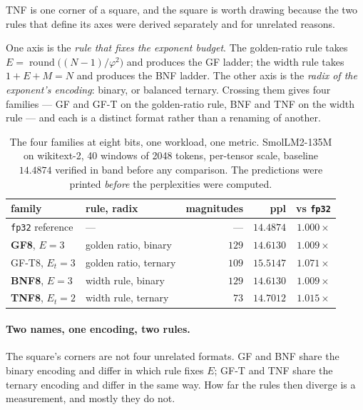 \documentclass[11pt]{article}
\theoremstyle{definition}
\begin{document}
TNF is one corner of a square, and the square is worth drawing because the two
rules that define its axes were derived separately and for unrelated reasons.

One axis is the \emph{rule that fixes the exponent budget}. The golden-ratio
rule takes $E=\operatorname{round}\!\bigl((N-1)/\varphi^{2}\bigr)$ and produces
the GF ladder; the width rule takes $1+E+M=N$ and produces the BNF ladder. The
other axis is the \emph{radix of the exponent's encoding}: binary, or balanced
ternary. Crossing them gives four families --- GF and GF-T on the golden-ratio
rule, BNF and TNF on the width rule --- and each is a distinct format rather
than a renaming of another.

\begin{table}[t]\centering
\caption{The four families at eight bits, one workload, one metric.
SmolLM2-135M on wikitext-2, 40 windows of 2048 tokens, per-tensor scale,
baseline $14.4874$ verified in band before any comparison. The predictions were
printed \emph{before} the perplexities were computed.}
\label{tab:fourfam}
\begin{tabular}{llrrr}
\toprule
family & rule, radix & magnitudes & ppl & vs \texttt{fp32} \\
\midrule
\texttt{fp32} reference & --- & --- & $14.4874$ & $1.000\times$ \\
\midrule
\textbf{GF8}, $E{=}3$   & golden ratio, binary  & $129$ & $\mathbf{14.6130}$ & $1.009\times$ \\
GF-T8, $E_t{=}3$        & golden ratio, ternary & $109$ & $15.5147$ & $1.071\times$ \\
\textbf{BNF8}, $E{=}3$  & width rule, binary    & $129$ & $\mathbf{14.6130}$ & $1.009\times$ \\
\textbf{TNF8}, $E_t{=}2$& width rule, ternary   & $73$  & $\mathbf{14.7012}$ & $1.015\times$ \\
\bottomrule
\end{tabular}
\end{table}

\paragraph{Two names, one encoding, two rules.} The square's corners are not
four unrelated formats. GF and BNF share the binary encoding and differ in which
rule fixes $E$; GF-T and TNF share the ternary encoding and differ in the same
way. How far the rules then diverge is a measurement, and mostly they do not.
\end{document}
